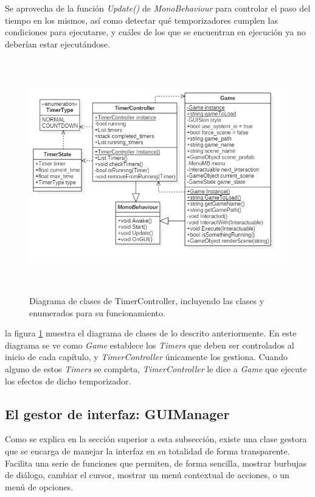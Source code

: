 Se aprovecha de la función \textit{Update()} de \textit{MonoBehaviour} para controlar el paso del tiempo en los mismos, así como detectar qué temporizadores cumplen las condiciones para ejecutarse, y cuáles de los que se encuentran en ejecución ya no deberían estar ejecutándose.

\begin{figure}[h!]
	\centerline{\includegraphics[height=4in]{figures/it2/TimerController.png}}
	\caption[TimerController - Versión Final]{Diagrama de clases de TimerController, incluyendo las clases y enumerados para su funcionamiento.}
	\label{timercontrollerit2}
\end{figure}

la figura \ref{timercontrollerit2} muestra el diagrama de clases de lo descrito anteriormente. En este diagrama se ve como \textit{Game} establece los \textit{Timers} que deben ser controlados al inicio de cada capítulo, y \textit{TimerController} únicamente los gestiona. Cuando alguno de estos \textit{Timers} se completa, \textit{TimerController} le dice a \textit{Game} que ejecute los efectos de dicho temporizador.

\newpage

\subsection{El gestor de interfaz: GUIManager}

Como se explica en la sección superior a esta subsección, existe una clase gestora que se encarga de manejar la interfaz en su totalidad de forma transparente. Facilita una serie de funciones que permiten, de forma sencilla, mostrar burbujas de diálogo, cambiar el cursor, mostrar un menú contextual de acciones, o un menú de opciones.


